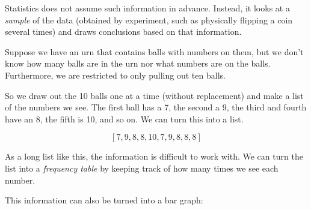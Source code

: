 \documentclass{ximera}
\begin{document}
Statistics does not assume such information in advance. Instead, it looks at a \emph{sample} of the data (obtained by experiment, such as physically flipping a coin several times) and draws conclusions based on that information.

Suppose we have an urn that contains balls with numbers on them, but we don't know how many balls are in the urn nor what numbers are on the balls. Furthermore, we are restricted to only pulling out ten balls.

So we draw out the 10 balls one at a time (without replacement) and make a list of the numbers we see. The first ball has a 7, the second a 9, the third and fourth have an 8, the fifth is 10, and so on. We can turn this into a list.

\[ [ 7, 9, 8, 8, 10, 7, 9, 8, 8, 8 ] \]

As a long list like this, the information is difficult to work with. We can turn the list into a \emph{frequency table} by keeping track of how many times we see each number.

\begin{image}
\end{image}

This information can also be turned into a bar graph:

\begin{image}
\end{image}
\end{document}
